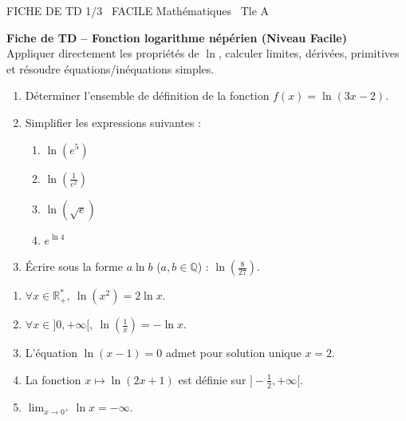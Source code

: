 \documentclass[11pt]{article}
\begin{document}
\begin{tcolorbox}[enhanced,colback=popink,colframe=popink,arc=10pt,boxrule=0pt,left=12pt,right=12pt,top=9pt,bottom=9pt]
{\color{white}\popxbold\small FICHE DE TD 1/3 \textbullet\ FACILE \hfill Mathématiques \textbullet\ Tle A\par}
\end{tcolorbox}
\vspace{4pt}
\noindent\textbf{Fiche de TD -- Fonction logarithme népérien (Niveau Facile)} \\ Appliquer directement les propriétés de $\ln$, calculer limites, dérivées, primitives et résoudre équations/inéquations simples.

\begin{exercice}
\begin{enumerate}
    \item Déterminer l'ensemble de définition de la fonction $f(x) = \ln(3x - 2)$.
    \item Simplifier les expressions suivantes : 
    \begin{enumerate}
        \item $\ln(e^5)$
        \item $\ln\left(\frac{1}{e^2}\right)$
        \item $\ln(\sqrt{e})$
        \item $e^{\ln 4}$
    \end{enumerate}
    \item Écrire sous la forme $a\ln b$ ($a,b \in \mathbb{Q}$) : $\ln\left(\frac{8}{27}\right)$.
\end{enumerate}
\end{exercice}

\begin{exercice}
\begin{enumerate}
    \item $\forall x \in \mathbb{R}^*_+,\ \ln(x^2) = 2\ln x$.
    \item $\forall x \in ]0, +\infty[,\ \ln\left(\frac{1}{x}\right) = -\ln x$.
    \item L'équation $\ln(x-1) = 0$ admet pour solution unique $x = 2$.
    \item La fonction $x \mapsto \ln(2x+1)$ est définie sur $]-\frac{1}{2}, +\infty[$.
    \item $\displaystyle\lim_{x \to 0^+} \ln x = -\infty$.
\end{enumerate}
\end{exercice}
\end{document}
